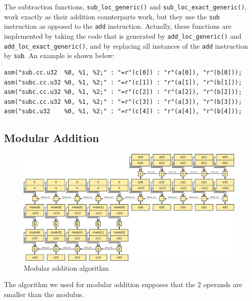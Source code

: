\documentclass[10pt, a4paper]{report}
\begin{document}
The subtraction functions, \verb+sub_loc_generic()+ and
\verb+sub_loc_exact_generic()+, work exactly as their addition counterparts
work, but they use the \verb+sub+ instruction as opposed to the \verb+add+
instruction.
Actually, these functions are implemented by taking the code that is generated
by \verb+add_loc_generic()+ and \verb+add_loc_exact_generic()+, and by replacing
all instances of the \verb+add+ instruction by \verb+sub+.
An example is shown below:

\begin{lstlisting}
asm("sub.cc.u32  %0, %1, %2;" : "=r"(c[0]) : "r"(a[0]), "r"(b[0]));
asm("subc.cc.u32 %0, %1, %2;" : "=r"(c[1]) : "r"(a[1]), "r"(b[1]));
asm("subc.cc.u32 %0, %1, %2;" : "=r"(c[2]) : "r"(a[2]), "r"(b[2]));
asm("subc.cc.u32 %0, %1, %2;" : "=r"(c[3]) : "r"(a[3]), "r"(b[3]));
asm("subc.u32    %0, %1, %2;" : "=r"(c[4]) : "r"(a[4]), "r"(b[4]));
\end{lstlisting}

\subsection{Modular Addition}
\begin{figure}[h]
\centering
\includegraphics[width=\linewidth]{figs/modular_addition}
\caption{Modular addition algorithm}
\label{fig:modular_addition}
\end{figure}

The algorithm we used for modular addition supposes that the 2 operands are
smaller than the modulus.

\end{document}
